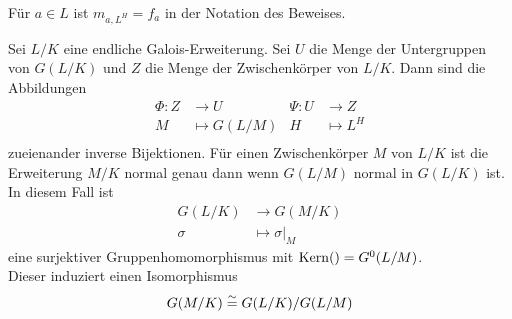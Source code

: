 	\begin{bem}
		Für $a\in  L$ ist $m_{a,L^H}=f_a$ in der Notation des Beweises.
	\end{bem}
	
	\begin{theorem}\label{satz:hsGal}
		Sei $L/K$ eine endliche Galois-Erweiterung. Sei $U$ die Menge der Untergruppen von $G(L/K)$ und $Z$ die Menge der Zwischenkörper von $L/K$. Dann sind die Abbildungen
		\begin{align*}
		\Phi:Z&\to U&\Psi:U&\to Z\\
		M&\mapsto G(L/M)&H&\mapsto L^H\\
		\end{align*}
		zueienander inverse Bijektionen. Für einen Zwischenkörper $M$ von $L/K$ ist die Erweiterung $M/K$ normal genau dann wenn $G(L/M)$ normal in $G(L/K)$ ist.\\
		In diesem Fall ist
		\begin{align*}
		G(L/K)&\to G(M/K)\\
		\sigma&\mapsto\sigma|_M
		\end{align*}
		eine surjektiver Gruppenhomomorphismus mit $\operatorname{Kern}()=G^0(L/M)$.\\
		Dieser induziert einen Isomorphismus
		\[G(M/K)\overset{\sim}{=} G(L/K)/G(L/M)\]
	\end{theorem}
